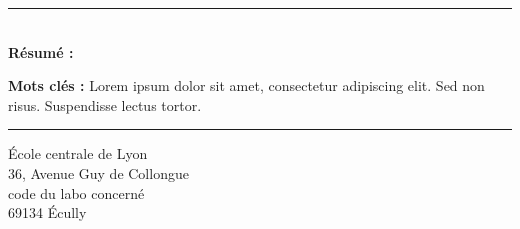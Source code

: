 \documentclass[a4paper,12pt,french]{article}
\begin{document}
\vspace*{\fill}
\noindent\rule[2pt]{\textwidth}{0.5pt}\\
{\textbf{Résumé :}}
\lipsum[1]

{\textbf{Mots clés :}}
Lorem ipsum dolor sit amet, consectetur adipiscing elit. Sed non risus. Suspendisse lectus tortor.
\\
\noindent\rule[2pt]{\textwidth}{0.5pt}
\begin{center}
  École centrale de Lyon\\
  36, Avenue Guy de Collongue\\
  code du labo concerné\\
  69134 Écully
\end{center}
\vspace*{\fill}
\end{document}
